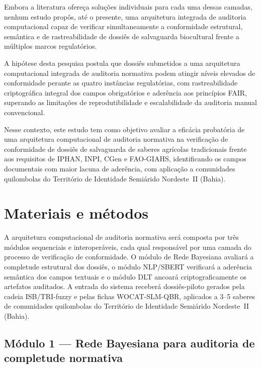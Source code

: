 \documentclass[preprint,12pt,authoryear]{elsarticle}
\begin{document}
Embora a literatura ofereça soluções individuais para cada uma dessas camadas, nenhum estudo propôs, até o presente, uma arquitetura integrada de auditoria computacional capaz de verificar simultaneamente a conformidade estrutural, semântica e de rastreabilidade de dossiês de salvaguarda biocultural frente a múltiplos marcos regulatórios.

A hipótese desta pesquisa postula que dossiês submetidos a uma arquitetura computacional integrada de auditoria normativa podem atingir níveis elevados de conformidade perante as quatro instâncias regulatórias, com rastreabilidade criptográfica integral dos campos obrigatórios e aderência aos princípios FAIR, superando as limitações de reprodutibilidade e escalabilidade da auditoria manual convencional.

Nesse contexto, este estudo tem como objetivo avaliar a eficácia probatória de uma arquitetura computacional de auditoria normativa na verificação de conformidade de dossiês de salvaguarda de saberes agrícolas tradicionais frente aos requisitos de IPHAN, INPI, CGen e FAO-GIAHS, identificando os campos documentais com maior lacuna de aderência, com aplicação a comunidades quilombolas do Território de Identidade Semiárido Nordeste~II (Bahia).


\section{Materiais e métodos}
\label{sec:methods}

A arquitetura computacional de auditoria normativa será composta por três módulos sequenciais e interoperáveis, cada qual responsável por uma camada do processo de verificação de conformidade. O módulo de Rede Bayesiana avaliará a completude estrutural dos dossiês, o módulo NLP/SBERT verificará a aderência semântica dos campos textuais e o módulo DLT ancoará criptograficamente os artefatos auditados. A entrada do sistema receberá dossiês-piloto gerados pela cadeia ISB/TRI-fuzzy e pelas fichas WOCAT-SLM-QBR, aplicados a 3--5 saberes de comunidades quilombolas do Território de Identidade Semiárido Nordeste~II (Bahia).

\subsection{Módulo 1 --- Rede Bayesiana para auditoria de completude normativa}
\label{subsec:bayesnet}
\end{document}
